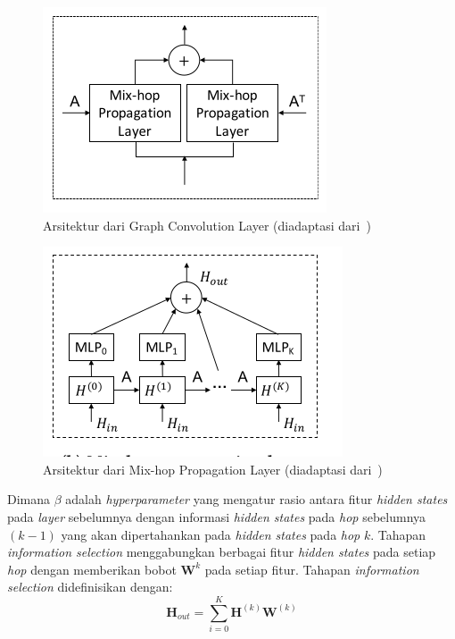 \begin{figure}[H]
    \centering
    \includegraphics[]{figures/gc_layer.png}
    \caption{Arsitektur dari Graph Convolution Layer (diadaptasi dari~\cite{Wu2020})}
    \label{fig:gc-layer}
\end{figure}



\begin{figure}[H]
    \centering
    \includegraphics[]{figures/mix_hop.png}
    \caption{Arsitektur dari Mix-hop Propagation Layer (diadaptasi dari~\cite{Wu2020})}
    \label{fig:mixhop-layer}
\end{figure}


Dimana $\beta$ adalah \textit{hyperparameter} yang mengatur rasio antara fitur \textit{hidden states} pada \textit{layer} sebelumnya dengan informasi \textit{hidden states} pada \textit{hop} sebelumnya $(k-1)$ yang akan dipertahankan pada \textit{hidden states} pada \textit{hop} $k$. Tahapan \textit{information selection} menggabungkan berbagai fitur \textit{hidden states} pada setiap \textit{hop} dengan memberikan bobot $\mathbf{W}^{k}$ pada setiap fitur. Tahapan \textit{information selection} didefinisikan dengan:
\begin{equation}
    \mathbf{H}_{out} = \sum_{i=0}^{K}\mathbf{H}^{(k)}\mathbf{W}^{(k)}
\end{equation}

